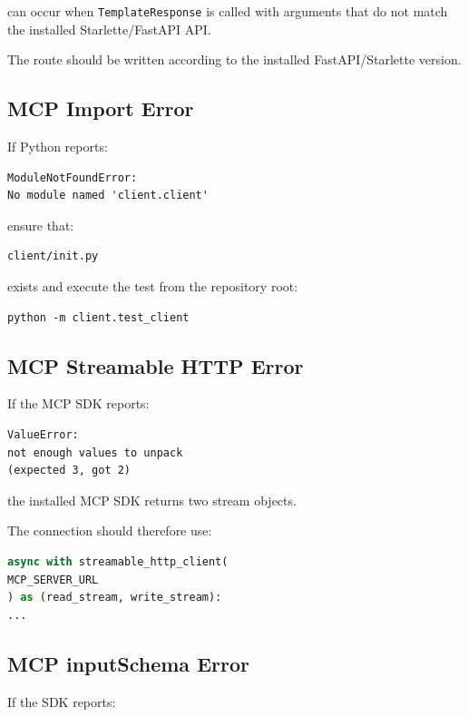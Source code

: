 \documentclass[11pt,a4paper]{article}
\begin{document}
can occur when \texttt{TemplateResponse} is called with arguments
that do not match the installed Starlette/FastAPI API.

The route should be written according to the installed FastAPI/Starlette
version.

\subsection{MCP Import Error}

If Python reports:

\begin{lstlisting}[style=terminal]
ModuleNotFoundError:
No module named 'client.client'
\end{lstlisting}

ensure that:

\begin{lstlisting}[style=terminal]
client/init.py
\end{lstlisting}

exists and execute the test from the repository root:

\begin{lstlisting}[style=terminal]
python -m client.test_client
\end{lstlisting}

\subsection{MCP Streamable HTTP Error}

If the MCP SDK reports:

\begin{lstlisting}[style=terminal]
ValueError:
not enough values to unpack
(expected 3, got 2)
\end{lstlisting}

the installed MCP SDK returns two stream objects.

The connection should therefore use:

\begin{lstlisting}[style=python,language=Python]
async with streamable_http_client(
MCP_SERVER_URL
) as (read_stream, write_stream):
...
\end{lstlisting}

\subsection{MCP inputSchema Error}

If the SDK reports:
\end{document}
